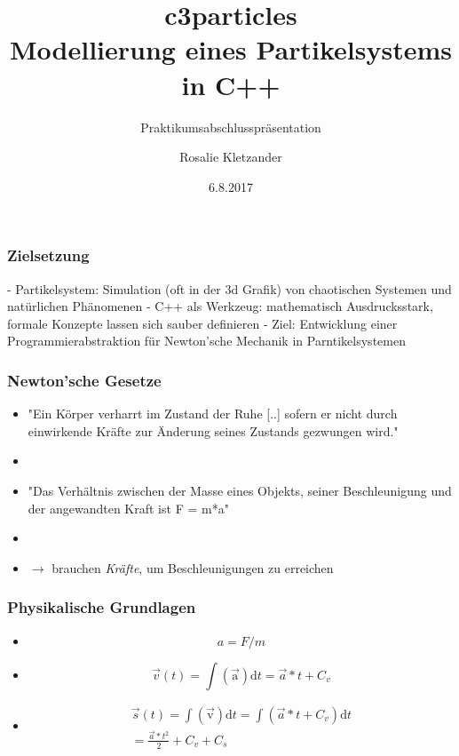 \documentclass{beamer}
\title{c3particles \\ Modellierung eines Partikelsystems in C++}
\subtitle{Praktikumsabschlusspr\"asentation}
\author{Rosalie Kletzander}
\institute{Institut f\"ur Informatik, LMU M\"unchen}
\date{6.8.2017}
\begin{document}
 
\frame{\titlepage}
 
\begin{frame}
\frametitle{Zielsetzung}
- Partikelsystem: Simulation (oft in der 3d Grafik) von chaotischen Systemen und nat\"urlichen Ph\"anomenen \linebreak
\linebreak
- C++ als Werkzeug: mathematisch Ausdrucksstark, formale Konzepte lassen sich sauber definieren \linebreak
\linebreak
- Ziel: Entwicklung einer Programmierabstraktion f\"ur Newton'sche Mechanik in Parntikelsystemen

\end{frame}

\begin{frame}
\frametitle{Newton'sche Gesetze}
\begin{itemize}[label={}]
 \item<1-> "Ein Körper verharrt im Zustand der Ruhe [..] sofern er nicht durch einwirkende Kr\"afte zur \"Anderung seines Zustands gezwungen wird."
 \item
 \item<2-> "Das Verh\"altnis zwischen der Masse eines Objekts, seiner Beschleunigung und der angewandten Kraft ist F = m*a"
 \item
 \item<3-> $\rightarrow$ brauchen \emph{Kr\"afte}, um Beschleunigungen zu erreichen
\end{itemize}
\end{frame}

\begin{frame}
\frametitle{Physikalische Grundlagen}
\begin{itemize}[label={}]
 \item<1-> \begin{equation}
a = F/m
\end{equation}
\item<2->
\begin{equation}
\overrightarrow{v}(t) = \int \mathrm{(\overrightarrow{a})} \mathrm{d}t = \overrightarrow{a}*t + C_v
\end{equation}
 \item<3-> \begin{align}
\overrightarrow{s}(t) = \int \mathrm{(\overrightarrow{v})} \mathrm{d}t = \int (\overrightarrow{a}*t + C_v) \mathrm{d}t \\ = \frac{\overrightarrow{a}*t^2}{2} + C_v + C_s
\end{align}
\end{itemize}
\end{frame}
\end{document}
